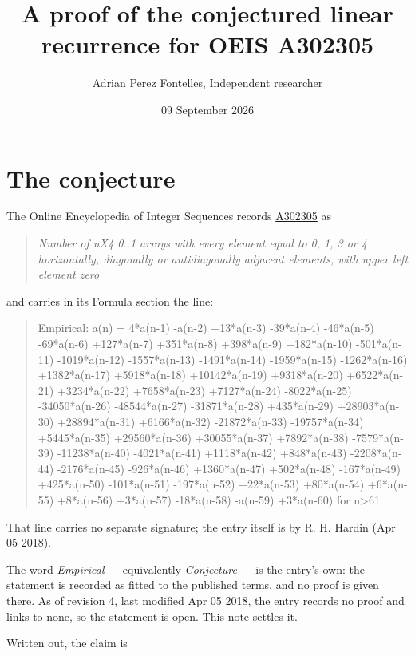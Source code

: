 \documentclass[11pt]{article}
\title{A proof of the conjectured linear recurrence for OEIS A302305}
\author{Adrian Perez Fontelles, Independent researcher}
\date{09 September 2026}
\theoremstyle{definition}
\begin{document}
\maketitle
\section{The conjecture}

The Online Encyclopedia of Integer Sequences records \href{https://oeis.org/A302305}{A302305} as

\begin{quote}\itshape Number of nX4 0..1 arrays with every element equal to 0, 1, 3 or 4 horizontally, diagonally or antidiagonally adjacent elements, with upper left element zero\end{quote}

and carries in its Formula section the line:

\begin{quote}\ttfamily Empirical: a(n) = 4*a(n-1) -a(n-2) +13*a(n-3) -39*a(n-4) -46*a(n-5) -69*a(n-6) +127*a(n-7) +351*a(n-8) +398*a(n-9) +182*a(n-10) -501*a(n-11) -1019*a(n-12) -1557*a(n-13) -1491*a(n-14) -1959*a(n-15) -1262*a(n-16) +1382*a(n-17) +5918*a(n-18) +10142*a(n-19) +9318*a(n-20) +6522*a(n-21) +3234*a(n-22) +7658*a(n-23) +7127*a(n-24) -8022*a(n-25) -34050*a(n-26) -48544*a(n-27) -31871*a(n-28) +435*a(n-29) +28903*a(n-30) +28894*a(n-31) +6166*a(n-32) -21872*a(n-33) -19757*a(n-34) +5445*a(n-35) +29560*a(n-36) +30055*a(n-37) +7892*a(n-38) -7579*a(n-39) -11238*a(n-40) -4021*a(n-41) +1118*a(n-42) +848*a(n-43) -2208*a(n-44) -2176*a(n-45) -926*a(n-46) +1360*a(n-47) +502*a(n-48) -167*a(n-49) +425*a(n-50) -101*a(n-51) -197*a(n-52) +22*a(n-53) +80*a(n-54) +6*a(n-55) +8*a(n-56) +3*a(n-57) -18*a(n-58) -a(n-59) +3*a(n-60) for n>61\end{quote}

That line carries no separate signature; the entry itself is by R. H. Hardin (Apr 05 2018).

The word {\itshape Empirical} --- equivalently {\itshape Conjecture} --- is the entry's own: the statement is recorded as fitted to the published terms, and no proof is given there. As of revision 4, last modified Apr 05 2018, the entry records no proof and links to none, so the statement is open. This note settles it.

Written out, the claim is
\end{document}
